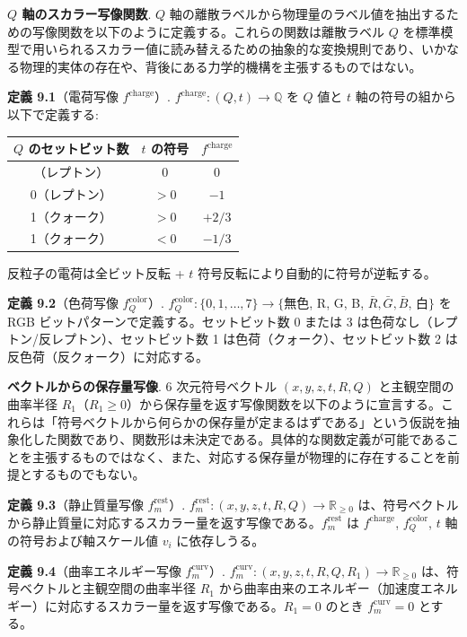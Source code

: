 \documentclass[
  a4paper,11pt]{ltjsarticle}
\newcounter{none}
\theoremstyle{definition}
\theoremstyle{remark}
\begin{document}
\textbf{\(Q\) 軸のスカラー写像関数}. \(Q\)
軸の離散ラベルから物理量のラベル値を抽出するための写像関数を以下のように定義する。これらの関数は離散ラベル
\(Q\)
を標準模型で用いられるスカラー値に読み替えるための抽象的な変換規則であり、いかなる物理的実体の存在や、背後にある力学的機構を主張するものではない。

\textbf{定義 9.1}（電荷写像 \(f^{\text{charge}}\)）.
\(f^{\text{charge}}: (Q, t) \to \mathbb{Q}\) を \(Q\) 値と \(t\)
軸の符号の組から以下で定義する:

{\def\LTcaptype{none} %
\begin{longtable}[]{@{}ccc@{}}
\toprule\noalign{}
\(Q\) のセットビット数 & \(t\) の符号 & \(f^{\text{charge}}\) \\
\midrule\noalign{}
\endhead
\bottomrule\noalign{}
\endlastfoot
0（レプトン） & \(0\) & \(0\) \\
0（レプトン） & \(> 0\) & \(-1\) \\
1（クォーク） & \(> 0\) & \(+2/3\) \\
1（クォーク） & \(< 0\) & \(-1/3\) \\
\end{longtable}
}

反粒子の電荷は全ビット反転 + \(t\)
符号反転により自動的に符号が逆転する。

\textbf{定義 9.2}（色荷写像 \(f_Q^{\text{color}}\)）.
\(f_Q^{\text{color}}: \{0, 1, \ldots, 7\} \to \{\)無色, R, G, B,
\(\bar{R}, \bar{G}, \bar{B}\), 白\(\}\) を RGB
ビットパターンで定義する。セットビット数 0 または 3
は色荷なし（レプトン/反レプトン）、セットビット数 1
は色荷（クォーク）、セットビット数 2 は反色荷（反クォーク）に対応する。

\textbf{ベクトルからの保存量写像}. 6 次元符号ベクトル
\((x, y, z, t, R, Q)\) と主観空間の曲率半径
\(R_1\)（\(R_1 \geq 0\)）から保存量を返す写像関数を以下のように宣言する。これらは「符号ベクトルから何らかの保存量が定まるはずである」という仮説を抽象化した関数であり、関数形は未決定である。具体的な関数定義が可能であることを主張するものではなく、また、対応する保存量が物理的に存在することを前提とするものでもない。

\textbf{定義 9.3}（静止質量写像 \(f_m^{\text{rest}}\)）.
\(f_m^{\text{rest}}: (x, y, z, t, R, Q) \to \mathbb{R}_{\geq 0}\)
は、符号ベクトルから静止質量に対応するスカラー量を返す写像である。\(f_m^{\text{rest}}\)
は \(f^{\text{charge}}\), \(f_Q^{\text{color}}\), \(t\)
軸の符号および軸スケール値 \(v_i\) に依存しうる。

\textbf{定義 9.4}（曲率エネルギー写像 \(f_m^{\text{curv}}\)）.
\(f_m^{\text{curv}}: (x, y, z, t, R, Q, R_1) \to \mathbb{R}_{\geq 0}\)
は、符号ベクトルと主観空間の曲率半径 \(R_1\)
から曲率由来のエネルギー（加速度エネルギー）に対応するスカラー量を返す写像である。\(R_1 = 0\)
のとき \(f_m^{\text{curv}} = 0\) とする。
\end{document}
